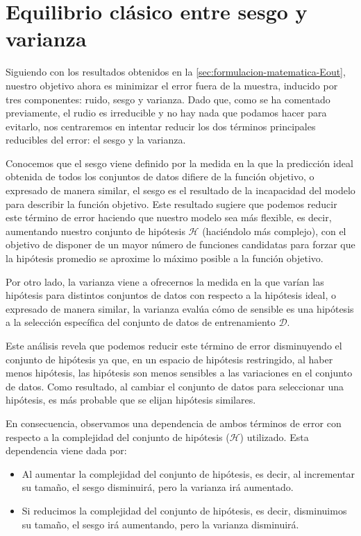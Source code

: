 \section{Equilibrio clásico entre sesgo y varianza}\label{sec:equilibrio-sesgo-varianza}
Siguiendo con los resultados obtenidos en la \autoref{sec:formulacion-matematica-Eout}, nuestro objetivo ahora es minimizar el error fuera de la muestra, inducido por tres componentes: ruido, sesgo y varianza. Dado que, como se ha comentado previamente, el rudio es irreducible y no hay nada que podamos hacer para evitarlo, nos centraremos en intentar reducir los dos términos principales reducibles del error: el sesgo y la varianza.

Conocemos que el sesgo viene definido por la medida en la que la predicción ideal obtenida de todos los conjuntos de datos difiere de la función objetivo, o expresado de manera similar, el sesgo es el resultado de la incapacidad del modelo para describir la función objetivo. Este resultado sugiere que podemos reducir este término de error haciendo que nuestro modelo sea más flexible, es decir, aumentando nuestro conjunto de hipótesis $\mathcal{H}$ (haciéndolo más complejo), con el objetivo de disponer de un mayor número de funciones candidatas para forzar que la hipótesis promedio se aproxime lo máximo posible a la función objetivo.

Por otro lado, la varianza viene a ofrecernos la medida en la que varían las hipótesis para distintos conjuntos de datos con respecto a la hipótesis ideal, o expresado de manera similar, la varianza evalúa cómo de sensible es una hipótesis a la selección específica del conjunto de datos de entrenamiento $\mathcal{D}$.

Este análisis revela que podemos reducir este término de error disminuyendo el conjunto de hipótesis ya que, en un espacio de hipótesis restringido, al haber menos hipótesis, las hipótesis son menos sensibles a las variaciones en el conjunto de datos. Como resultado, al cambiar el conjunto de datos para seleccionar una hipótesis, es más probable que se elijan hipótesis similares.

En consecuencia, observamos una dependencia de ambos términos de error con respecto a la complejidad del conjunto de hipótesis ($\mathcal{H}$) utilizado. Esta dependencia viene dada por:

\begin{itemize}
    \item Al aumentar la complejidad del conjunto de hipótesis, es decir, al incrementar su tamaño, el sesgo disminuirá, pero la varianza irá aumentado.
    \item Si reducimos la complejidad del conjunto de hipótesis, es decir, disminuimos su tamaño, el sesgo irá aumentando, pero la varianza disminuirá.
\end{itemize}

